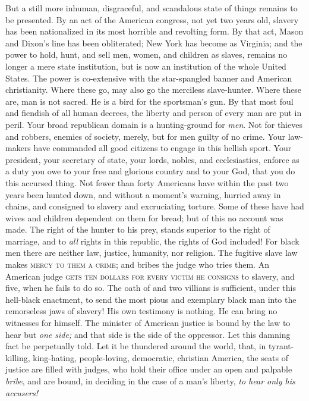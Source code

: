 But a still more inhuman, disgraceful, and scandalous state of things
remains to be presented. By an act of the American congress, not yet two
years old, slavery has been nationalized in its {}most horrible and
revolting form. By that act, Mason and Dixon's line has been
obliterated; New York has become as Virginia; and the power to hold,
hunt, and sell men, women, and children as slaves, remains no longer a
mere state institution, but is now an institution of the whole United
States. The power is co-extensive with the star-spangled banner and
American christianity. Where these go, may also go the merciless
slave-hunter. Where these are, man is not sacred. He is a bird for the
sportsman's gun. By that most foul and fiendish of all human decrees,
the liberty and person of every man are put in peril. Your broad
republican domain is a hunting-ground for \emph{men}. Not for thieves
and robbers, enemies of society, merely, but for men guilty of no crime.
Your law-makers have commanded all good citizens to engage in this
hellish sport. Your president, your secretary of state, your lords,
nobles, and ecclesiastics, enforce as a duty you owe to your free and
glorious country and to your God, that you do this accursed thing. Not
fewer than forty Americans have within the past two years been hunted
down, and without a moment's warning, hurried away in chains, and
consigned to slavery and excruciating torture. Some of these have had
wives and children dependent on them for bread; but of this no account
was made. The right of the hunter to his prey, stands superior to the
right of marriage, and to \emph{all} rights in this republic, the rights
of God included! For black men there are neither law, justice, humanity,
nor religion. The fugitive slave law makes \textsc{mercy to them a
crime}; and bribes the judge who tries them. An American judge
\textsc{gets ten dollars for every victim he consigns} to slavery, and
five, when he fails to do so. The oath of {and} two villians is
sufficient, under this hell-black enactment, to send the most pious and
exemplary black man into the remorseless jaws of slavery! His own
testimony is nothing. He can bring no witnesses for himself. The
minister of American justice is bound by the law to hear but \emph{one
side;} and that side is the side of the oppressor. Let this damning fact
be perpetually told. Let it be thundered around the world, that, in
tyrant-killing, king-hating, people-loving, democratic, christian
America, the seats of justice are filled with judges, who hold their
office under an open and palpable \emph{bribe}, and are bound, in
deciding in the case of a man's liberty, \emph{to hear only his
accusers!}

